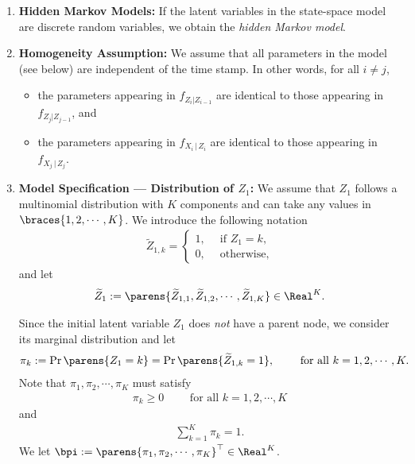 \documentclass[12pt]{article}
\begin{document}
\begin{enumerate}[label=\textbf{\arabic*.}]
	
	\item \textbf{Hidden Markov Models:} If the latent variables in the state-space model are discrete random variables, we obtain the \emph{hidden Markov model}. 
	
	\item \textbf{Homogeneity Assumption:} We assume that all parameters in the model (see below) are independent of the time stamp. In other words, for all $i \neq j$, 
	\begin{itemize}
		\item the parameters appearing in $f_{Z_i \vert Z_{i-1}}$ are identical to those appearing in $f_{Z_j \vert Z_{j-1}}$, and 
		\item the parameters appearing in $f_{X_i \,\vert\, Z_{i}}$ are identical to those appearing in $f_{X_j \,\vert\, Z_{j}}$. 
	\end{itemize}
	
	\item \textbf{Model Specification --- Distribution of $Z_1$:} We assume that $Z_1$ follows a multinomial distribution with $K$ components and can take any values in $\braces{1, 2, \cdots, K}$. We introduce the following notation 
	\begin{align*}
		\widetilde{Z}_{1, k} = \begin{cases}
			1, & \, \text{ if } Z_1 = k, \\ 
			0, & \, \text{ otherwise}, 
		\end{cases}
	\end{align*}
	and let 
	\begin{align*}
		\widetilde{Z}_1 := \parens{\widetilde{Z}_{1,1}, \widetilde{Z}_{1,2}, \cdots, \widetilde{Z}_{1,K}} \in \Real^K. 
	\end{align*}
	
	Since the initial latent variable $Z_1$ does \emph{not} have a parent node, we consider its marginal distribution and let 
	\begin{align*}
		\pi_k := \Pr \parens{Z_1 = k} = \Pr \parens{\widetilde{Z}_{1,k} = 1}, \qquad \text{ for all } k = 1, 2, \cdots, K. 
	\end{align*}
	Note that $\pi_1, \pi_2, \cdots, \pi_K$ must satisfy 
	\begin{align*}
		\pi_k \ge 0 \qquad \text{ for all } k = 1, 2, \cdots, K
	\end{align*}
	and 
	\begin{align}\label{eq-constraint-pi}
		\sum_{k=1}^K \pi_k = 1. 
	\end{align}
	We let $\bpi := \parens{\pi_1, \pi_2, \cdots, \pi_K}^{\top} \in \Real^K$. 
	

\end{enumerate}
\end{document}
